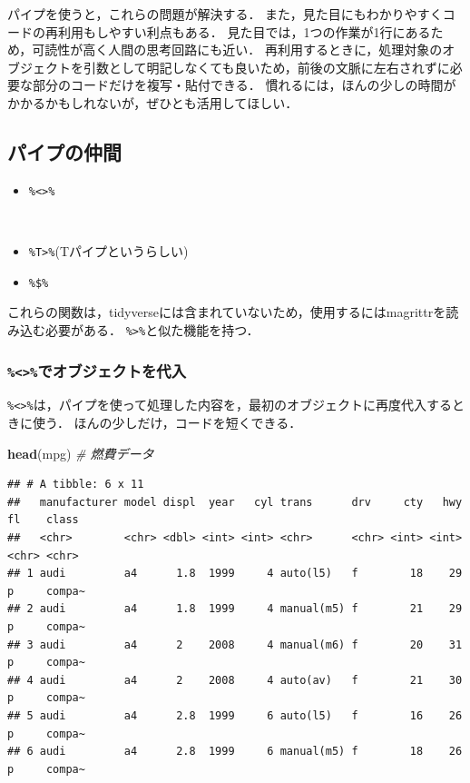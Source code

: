 \documentclass[
]{article}
\newenvironment{Shaded}{\begin{snugshade}}{\end{snugshade}}
\newcommand{\CommentTok}[1]{\textcolor[rgb]{0.56,0.35,0.01}{\textit{#1}}}
\newcommand{\FunctionTok}[1]{\textcolor[rgb]{0.13,0.29,0.53}{\textbf{#1}}}
\newcommand{\NormalTok}[1]{#1}
\providecommand{\tightlist}{%
  \setlength{\itemsep}{0pt}\setlength{\parskip}{0pt}}
\begin{document}
パイプを使うと，これらの問題が解決する．
また，見た目にもわかりやすくコードの再利用もしやすい利点もある．
見た目では，1つの作業が1行にあるため，可読性が高く人間の思考回路にも近い．
再利用するときに，処理対象のオブジェクトを引数として明記しなくても良いため，前後の文脈に左右されずに必要な部分のコードだけを複写・貼付できる．
慣れるには，ほんの少しの時間がかかるかもしれないが，ぜひとも活用してほしい．

\hypertarget{ux30d1ux30a4ux30d7ux306eux4ef2ux9593}{%
\subsection{パイプの仲間}\label{ux30d1ux30a4ux30d7ux306eux4ef2ux9593}}

\begin{itemize}
\tightlist
\item
  \texttt{\%\textless{}\textgreater{}\%}\strut \\
\item
  \texttt{\%T\textgreater{}\%}(Tパイプというらしい)\\
\item
  \texttt{\%\$\%}
\end{itemize}

これらの関数は，tidyverseには含まれていないため，使用するにはmagrittrを読み込む必要がある．
\texttt{\%\textgreater{}\%}と似た機能を持つ．

\hypertarget{ux3067ux30aaux30d6ux30b8ux30a7ux30afux30c8ux3092ux4ee3ux5165}{%
\subsubsection{\texorpdfstring{\texttt{\%\textless{}\textgreater{}\%}でオブジェクトを代入}{\%\textless\textgreater\%でオブジェクトを代入}}\label{ux3067ux30aaux30d6ux30b8ux30a7ux30afux30c8ux3092ux4ee3ux5165}}

\texttt{\%\textless{}\textgreater{}\%}は，パイプを使って処理した内容を，最初のオブジェクトに再度代入するときに使う．
ほんの少しだけ，コードを短くできる．

\begin{Shaded}
\begin{Highlighting}[]
\FunctionTok{head}\NormalTok{(mpg) }\CommentTok{\# 燃費データ}
\end{Highlighting}
\end{Shaded}

\begin{verbatim}
## # A tibble: 6 x 11
##   manufacturer model displ  year   cyl trans      drv     cty   hwy fl    class 
##   <chr>        <chr> <dbl> <int> <int> <chr>      <chr> <int> <int> <chr> <chr> 
## 1 audi         a4      1.8  1999     4 auto(l5)   f        18    29 p     compa~
## 2 audi         a4      1.8  1999     4 manual(m5) f        21    29 p     compa~
## 3 audi         a4      2    2008     4 manual(m6) f        20    31 p     compa~
## 4 audi         a4      2    2008     4 auto(av)   f        21    30 p     compa~
## 5 audi         a4      2.8  1999     6 auto(l5)   f        16    26 p     compa~
## 6 audi         a4      2.8  1999     6 manual(m5) f        18    26 p     compa~
\end{verbatim}
\end{document}
